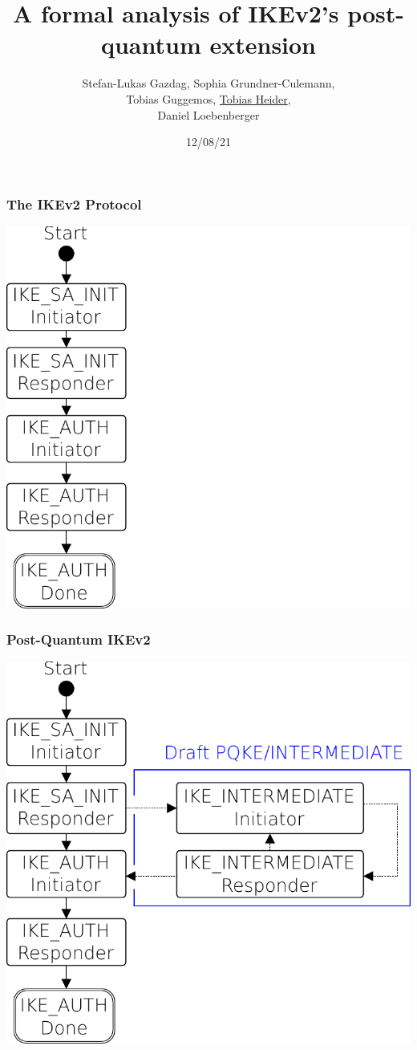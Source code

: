 \documentclass{beamer}
\title{A formal analysis of IKEv2's post-quantum extension}
\author{Stefan-Lukas Gazdag, Sophia Grundner-Culemann,\\
    Tobias Guggemos, \underline{Tobias Heider},\\
    Daniel Loebenberger}
\institute{ACSAC2021}
\date{12/08/21}
\begin{document}
\begin{frame}
	\titlepage
\end{frame}

\begin{frame}
\frametitle{The IKEv2 Protocol}
\centering
\includegraphics[width=.8\textwidth]{statemachine-classic.pdf}
\end{frame}

\begin{frame}
\frametitle{Post-Quantum IKEv2}
\centering
\includegraphics[width=.8\textwidth]{statemachine-pq.pdf}
\end{frame}
\end{document}
